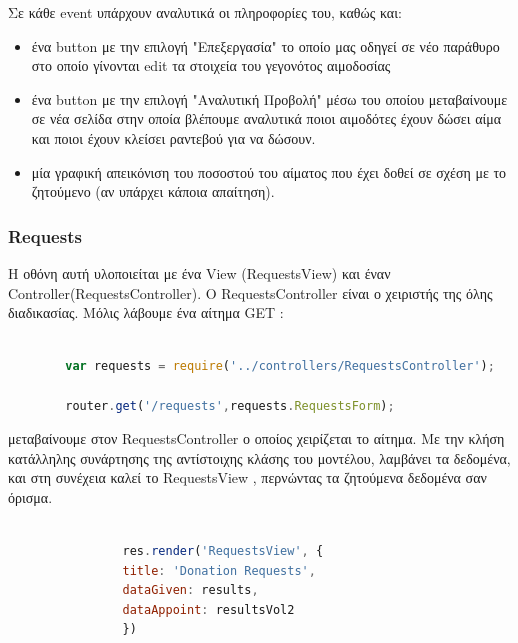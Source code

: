 		Σε κάθε event υπάρχουν αναλυτικά οι πληροφορίες του, καθώς και:
		
		\begin{itemize}
		\item ένα button με την επιλογή "Επεξεργασία" το οποίο μας οδηγεί σε νέο παράθυρο στο οποίο γίνονται edit τα στοιχεία του γεγονότος αιμοδοσίας
		
		\item ένα button με την επιλογή "Αναλυτική Προβολή" μέσω του οποίου μεταβαίνουμε σε νέα σελίδα στην οποία βλέπουμε αναλυτικά ποιοι αιμοδότες έχουν δώσει αίμα και ποιοι έχουν κλείσει ραντεβού για να δώσουν.
		
		\item μία γραφική απεικόνιση του ποσοστού του αίματος που έχει δοθεί σε σχέση με το ζητούμενο (αν υπάρχει κάποια απαίτηση).
		
		\end{itemize}
		

		
				\subsubsection{Requests}
		
	Η οθόνη αυτή υλοποιείται με ένα View (RequestsView) και έναν Controller(RequestsController). O RequestsController είναι ο χειριστής της όλης διαδικασίας. Μόλις λάβουμε ένα αίτημα GET :
		
		\begin{lstlisting}[language=Javascript]			
		
		var requests = require('../controllers/RequestsController');
		
		router.get('/requests',requests.RequestsForm);  


		\end{lstlisting}
		
μεταβαίνουμε στον RequestsController ο οποίος χειρίζεται το αίτημα. Με την κλήση κατάλληλης συνάρτησης της αντίστοιχης κλάσης του μοντέλου, λαμβάνει τα δεδομένα,  και στη συνέχεια καλεί το RequestsView , περνώντας τα ζητούμενα δεδομένα σαν όρισμα.



		\begin{lstlisting}[language=Javascript]			
		
	            res.render('RequestsView', { 
                title: 'Donation Requests',
                dataGiven: results,
                dataAppoint: resultsVol2
                })
                
		\end{lstlisting}
		
